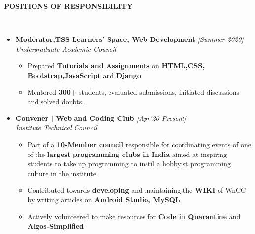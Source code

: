 \documentclass[letterpaper,11pt]{article}
\newcommand{\resheading}[1]{{\small \colorbox{mygrey}{\begin{minipage}{0.975\textwidth}{\textbf{#1 \vphantom{p\^{E}}}}\end{minipage}}}}
\newcommand{\lsep}{-0.5cm}
\newcommand{\isep}{-2 pt}
\newcommand{\sep}{-1 pt}
\begin{document}
\resheading{\textbf{\large{POSITIONS OF RESPONSIBILITY}} }\\[\lsep]
\begin{itemize}\itemsep \sep
\item
\textbf{\noindent \large{Moderator,TSS Learners' Space, Web Development}
} \hfill{\em [Summer 2020]}\\
\emph{Undergraduate Academic Council}
 \begin{itemize}\itemsep \isep
 
    \item{Prepared \textbf {Tutorials and Assignments} on{\textbf{ HTML,CSS, Bootstrap,JavaScript} and \textbf{Django} }}
    \item{Mentored \textbf{300+} students, evaluated submissions, initiated discussions and solved doubts.}
    
     \end{itemize}
\item
    \textbf{\noindent \large{Convener | Web and Coding Club }
} \hfill{\em [Apr'20-Present]}\\
\emph{Institute Technical Council}
 \begin{itemize}\itemsep \isep
  \item{Part of a \textbf{10-Member council} responsible for coordinating events of one of the  \textbf{largest programming clubs in India} aimed at inspiring students to take up programming to instil a hobbyist programming culture in the institute}
  \item{Contributed towards \textbf{developing} and maintaining the \textbf{WIKI} of WnCC by writing articles on \textbf{Android Studio, MySQL}}
  \item{Actively volunteered to make resources for \textbf{Code in Quarantine} and \textbf{Algos-Simplified}}
 
 \end{itemize}
 \end{itemize}

\end{document}

